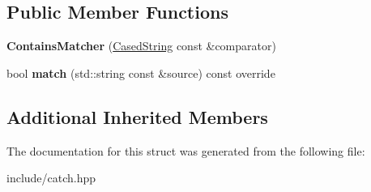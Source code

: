 \subsection*{Public Member Functions}
\begin{DoxyCompactItemize}
\item 
{\bfseries Contains\+Matcher} (\hyperlink{structCatch_1_1Matchers_1_1StdString_1_1CasedString}{Cased\+String} const \&comparator)\hypertarget{structCatch_1_1Matchers_1_1StdString_1_1ContainsMatcher_acc892883c8409e34b28c9b39d4ef1fe3}{}\label{structCatch_1_1Matchers_1_1StdString_1_1ContainsMatcher_acc892883c8409e34b28c9b39d4ef1fe3}

\item 
bool {\bfseries match} (std\+::string const \&source) const override\hypertarget{structCatch_1_1Matchers_1_1StdString_1_1ContainsMatcher_a630628b234b037be83fe587081a80b53}{}\label{structCatch_1_1Matchers_1_1StdString_1_1ContainsMatcher_a630628b234b037be83fe587081a80b53}

\end{DoxyCompactItemize}
\subsection*{Additional Inherited Members}


The documentation for this struct was generated from the following file\+:\begin{DoxyCompactItemize}
\item 
include/catch.\+hpp\end{DoxyCompactItemize}
